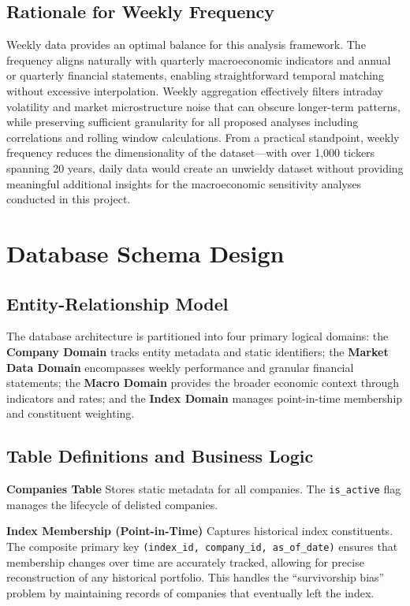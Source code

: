 \documentclass[10pt,a4paper]{article}
\begin{document}
\subsection{Rationale for Weekly Frequency}
Weekly data provides an optimal balance for this analysis framework. The frequency aligns naturally with quarterly macroeconomic indicators and annual or quarterly financial statements, enabling straightforward temporal matching without excessive interpolation. Weekly aggregation effectively filters intraday volatility and market microstructure noise that can obscure longer-term patterns, while preserving sufficient granularity for all proposed analyses including correlations and rolling window calculations. From a practical standpoint, weekly frequency reduces the dimensionality of the dataset—with over 1,000 tickers spanning 20 years, daily data would create an unwieldy dataset without providing meaningful additional insights for the macroeconomic sensitivity analyses conducted in this project.

\section{Database Schema Design}

\subsection{Entity-Relationship Model}

The database architecture is partitioned into four primary logical domains: the \textbf{Company Domain} tracks entity metadata and static identifiers; the \textbf{Market Data Domain} encompasses weekly performance and granular financial statements; the \textbf{Macro Domain} provides the broader economic context through indicators and rates; and the \textbf{Index Domain} manages point-in-time membership and constituent weighting.

\subsection{Table Definitions and Business Logic}

\textbf{Companies Table} Stores static metadata for all companies. The \texttt{is\_active} flag manages the lifecycle of delisted companies.

\textbf{Index Membership (Point-in-Time)} Captures historical index constituents. The composite primary key \texttt{(index\_id, company\_id, as\_of\_date)} ensures that membership changes over time are accurately tracked, allowing for precise reconstruction of any historical portfolio. This handles the ``survivorship bias'' problem by maintaining records of companies that eventually left the index.
\end{document}
